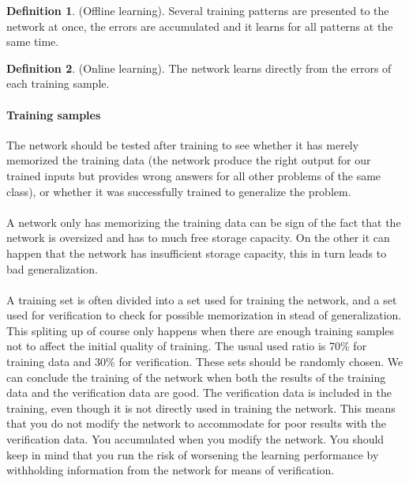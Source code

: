 \documentclass[pdftex,a4paper,12pt,twoside]{report}
\theoremstyle{plain} \newtheorem{theorem}{Theorem} \newtheorem{proposition}{Proposition} \newtheorem{lemma}{Lemma} \newtheorem*{corollary}{Corollary}
\theoremstyle{definition} \newtheorem{definition}{Definition} \newtheorem{conjecture}{Conjecture} \newtheorem*{example}{Example} \newtheorem{algorithm}{Algorithm}
\theoremstyle{remark} \newtheorem*{remark}{Remark} \newtheorem*{note}{Note} \newtheorem{case}{Case}
\begin{document}
\begin{definition}
(Offline learning). Several training patterns are presented to the
network at once, the errors are accumulated and it learns for all patterns at the same
time.
\end{definition}
\begin{definition}
(Online learning). The network learns directly from the errors of each
training sample.
\end{definition}
\paragraph{Training samples}
The network should be tested after training to see whether it has merely memorized the training data (the network produce the right output for our trained inputs but provides wrong answers for all other problems of the same class), or whether it was successfully trained to generalize the problem.\\\\A network only has memorizing the training data can be sign of the fact that the network is oversized and has to much free storage capacity. On the other it can happen that the network has insufficient storage capacity, this in turn leads to bad generalization.\\\\A training set is often divided into a set used for training the network, and a set used for verification to check for possible memorization in stead of generalization. This spliting up of course only happens when there are enough training samples not to affect the initial quality of training. The usual used ratio is 70\% for training data and 30\% for verification. These sets should be randomly chosen. We can conclude the training of the network when both the results of the training data and the verification data are good. The verification data is included in the training, even though it is not directly used in training the network. This means that you do not modify the network to accommodate for poor results with the verification data. You accumulated when you modify the network. You should keep in mind that you run the risk of worsening the learning performance by withholding information from the network for means of verification.
\end{document}
